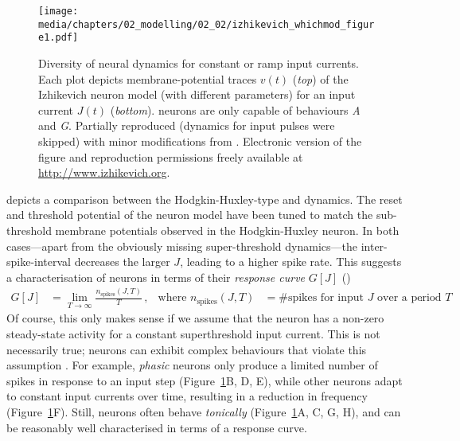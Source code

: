 \begin{figure}
	\centering
	\texttt{[image: media/chapters/02\_modelling/02\_02/izhikevich\_whichmod\_figure1.pdf]}%
	{\label{fig:izhikevich_whichmod_figure1a}}%
	{\label{fig:izhikevich_whichmod_figure1b}}%
	{\label{fig:izhikevich_whichmod_figure1c}}%
	{\label{fig:izhikevich_whichmod_figure1d}}%
	{\label{fig:izhikevich_whichmod_figure1e}}%
	{\label{fig:izhikevich_whichmod_figure1f}}%
	{\label{fig:izhikevich_whichmod_figure1g}}%
	{\label{fig:izhikevich_whichmod_figure1h}}%
	\caption[Diversity of neural dynamics for constant or ramp input currents]{Diversity of neural dynamics for constant or ramp input currents. Each plot depicts membrane-potential traces $v(t)$ (\emph{top}) of the Izhikevich neuron model (with different parameters) for an input current $J(t)$ (\emph{bottom}). \LIF neurons are only capable of behaviours \emph{A} and \emph{G}. Partially reproduced (dynamics for input pulses were skipped) with minor modifications from \citet{izhikevich2004which}. Electronic version of the figure and reproduction permissions freely available at \url{http://www.izhikevich.org}.}
	\label{fig:izhikevich_whichmod_figure1}
\end{figure}

 depicts a comparison between the Hodgkin-Huxley-type and \LIF dynamics.
The reset and threshold potential of the \LIF neuron model have been tuned to match the sub-threshold membrane potentials observed in the Hodgkin-Huxley neuron.
In both cases---apart from the obviously missing super-threshold dynamics---the inter-spike-interval decreases the larger $J$, leading to a higher spike rate.
This suggests a characterisation of neurons in terms of their \emph{response curve} $G[J]$ ()
\begin{align}
	G[J] &= \lim_{T \to \infty} \frac{n_\mathrm{spikes}(J, T)}{T} \,, & \text{where } n_\mathrm{spikes}(J, T) &= \text{\#spikes for input $J$ over a period $T$} \,.
	\label{eqn:response_curve}
\end{align}
Of course, this only makes sense if we assume that the neuron has a non-zero steady-state activity for a constant superthreshold input current.
This is not necessarily true; neurons can exhibit complex behaviours that violate this assumption \citep{izhikevich2004which}.
For example, \emph{phasic} neurons only produce a limited number of spikes in response to an input step (Figure~\ref{fig:izhikevich_whichmod_figure1}B, D, E), while other neurons adapt to constant input currents over time, resulting in a reduction in frequency (Figure~\ref{fig:izhikevich_whichmod_figure1}F).
Still, neurons often behave \emph{tonically} (Figure~\ref{fig:izhikevich_whichmod_figure1}A, C, G, H), and can be reasonably well characterised in terms of a response curve.

